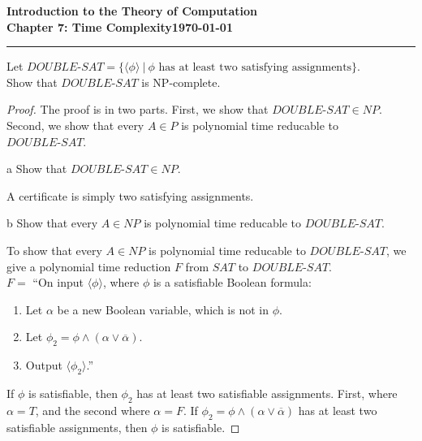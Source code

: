 \documentclass[11pt]{article}
\newcommand{\dated}{\today}
\begin{document}
\textbf{Introduction to the Theory of
Computation}\hfill\textbf{\myname}\\[0.01in]
\textbf{Chapter 7: Time Complexity}\hfill\textbf{\dated}\\
\smallskip\hrule\bigskip

\begin{problem}{7.22}
Let $DOUBLE\text{-}SAT = \{\langle \phi \rangle \ | \ \phi \text{ has at least two satisfying assignments}\}$. \\ Show that $DOUBLE\text{-}SAT$ is NP-complete.
\end{problem}

\begin{proof}
The proof is in two parts. First, we show that $DOUBLE\text{-}SAT \in NP$. Second, we show that every $A \in P$ is polynomial time reducable to $DOUBLE\text{-}SAT$.

\begin{problem}[Part]{a}
Show that $DOUBLE\text{-}SAT \in NP$.
\end{problem}

A certificate is simply two satisfying assignments.

\begin{problem}[Part]{b}
Show that every $A \in NP$ is polynomial time reducable to $DOUBLE\text{-}SAT$.
\end{problem}

To show that every $A \in NP$ is polynomial time reducable to $DOUBLE\text{-}SAT$, we give a polynomial time reduction $F$ from $SAT$ to $DOUBLE\text{-}SAT$. \\

$F =$ \textquotedblleft On input $\langle \phi \rangle$, where $\phi$ is a satisfiable Boolean formula:
\begin{enumerate}
\item Let $\alpha$ be a new Boolean variable, which is not in $\phi$.
\item Let $\phi_2 = \phi \wedge (\alpha \vee \overline{\alpha})$.
\item Output $\langle \phi_2 \rangle$.\textquotedblright
\end{enumerate}
If $\phi$ is satisfiable, then $\phi_2$ has at least two satisfiable assignments. First, where $\alpha = T$, and the second where $\alpha = F$. If $\phi_2 = \phi \wedge (\alpha \vee \overline{\alpha})$ has at least two satisfiable assignments, then $\phi$ is satisfiable.
\end{proof}
\end{document}
